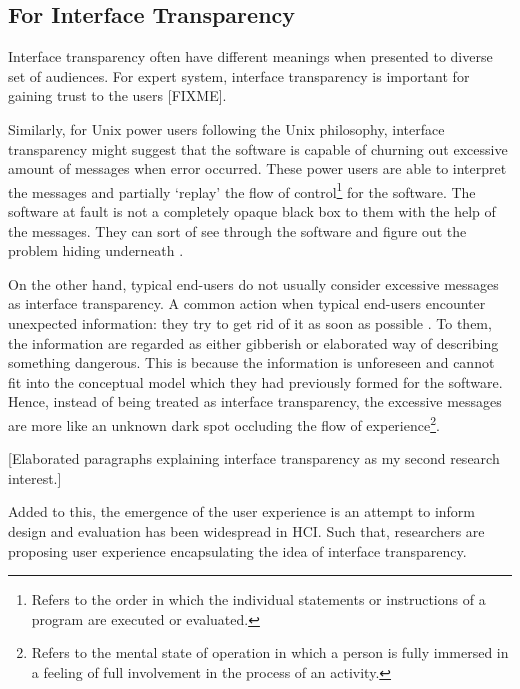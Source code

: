 \documentclass{acm_proc_article-sp}
\begin{document}
\subsection{For Interface Transparency}

Interface transparency often have different meanings when presented to
diverse set of audiences. For expert system, interface transparency is
important for gaining trust to the users [FIXME].

Similarly, for Unix power users following the Unix philosophy,
interface transparency might suggest that the software is capable of
churning out excessive amount of messages when error occurred. These
power users are able to interpret the messages and partially `replay'
the flow of control\footnote{Refers to the order in which the
  individual statements or instructions of a program are executed or
  evaluated.}  for the software. The software at fault is not a
completely opaque black box to them with the help of the
messages. They can sort of see through the software and figure out the
problem hiding underneath \citep{unix:raymond}.

On the other hand, typical end-users do not usually consider excessive
messages as interface transparency. A common action when typical
end-users encounter unexpected information: they try to get rid of it
as soon as possible \citep{oldnew:chen}. To them, the information are
regarded as either gibberish or elaborated way of describing something
dangerous. This is because the information is unforeseen and cannot
fit into the conceptual model which they had previously formed for the
software. Hence, instead of being treated as interface transparency,
the excessive messages are more like an unknown dark spot occluding
the flow of experience\footnote{Refers to the mental state of
  operation in which a person is fully immersed in a feeling of full
  involvement in the process of an activity.}.


[Elaborated paragraphs explaining interface transparency as my second
  research interest.]

Added to this, the emergence of the user experience is an attempt to
inform design and evaluation has been widespread in HCI. Such that,
researchers are proposing user experience encapsulating the idea of
interface transparency.
\end{document}
